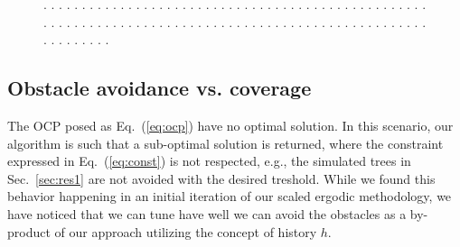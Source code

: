\documentclass[letterpaper,10pt,conference,twoside]{IEEEtran}
\theoremstyle{definition}
\begin{document}
\begin{figure}[t!]
  \begin{minipage}[t!]{.67\columnwidth}
    \hspace*{.1cm}
  \end{minipage}\hspace*{.6cm}
  \begin{minipage}[t!]{.25\columnwidth}
    \caption[.]{\textbf{.   }.   .   .   .   .   .   .   .   .   .   .   .   .   .   .   .   .   .   .   .   .   .   .   .   .   .   .   .   .   .   .   .   .   .   .   .   .   .   .   .   .   .   .   .   .   .   .   .   .   .   .   .   .   .   .   .   .   .   .   .   .   .   .   .   .   .   .   .   .   .   .   .   .   .   .   .   .   .   .   .   .   .   .   .   .   .   .   .   .   .   .   .   .   .   .   .   .   .   .   .   .   .   .   .   .   .   .   .   .   .   .   .   .   .   .   .   .   .   .   .   .   .   .   .   .   .   .   .   .   .   .   .   .   .   .   .   .   .   .   .   .   .   .   .   .   .   .   .   .   .   .   .   .   .   .   .   .   .   .   .   .   .   .   .   .   .   .   .   .   .   .   .   .   .   .   .   .   .   .   .   .   .   .   .   .   .   .   .   .   .   .   .   .   .   .   .   .   .   .   .   .   .   .   .   .   .   .   .   .   .   .   .   .   .   .   .   .   .   .   .   .   .   .   .   .   .   .   .   .   .   .   .   .   .   .   .   .   .   .   .   .   .   .}
    \vspace*{-.2cm}
    \label{fig:2}
  \end{minipage}
  \vspace*{-.2cm}
  \caption*{\footnotesize .   .   .   .   .   .   .   .   .   .   .   .   .   .   .   .   .   .   .   .   .   .   .   .   .   .   .   .   .   .   .   .   .   .   .   .   .   .   .   .   .   .   .   .   .   .   .   .   .   .   .   .   .   .   .   .   .   .   .   .   .   .   .   .   .   .   .   .   .   .   .   .   .   .   .   .   .   .   .   .   .   .   .   .   .   .   .   .   .   .   .   .   .   .   .   .   .   .   .   .   .   .   .   .   .   .   .   .   .}
\end{figure}

\subsection{Obstacle avoidance vs. coverage}\label{sec:res2}
\noindent
The OCP posed as Eq.~(\ref{eq:ocp}) have no optimal solution. In this scenario, our algorithm is such that a sub-optimal solution is returned, where the constraint expressed in Eq.~(\ref{eq:const}) is not respected, e.g., the simulated trees in Sec.~\ref{sec:res1} are not avoided with the desired treshold. 
While we found this behavior happening in an initial iteration of our scaled ergodic methodology, we have noticed that we can tune have well we can avoid the obstacles as a by-product of our approach utilizing the concept of history $h$. 
\end{document}
